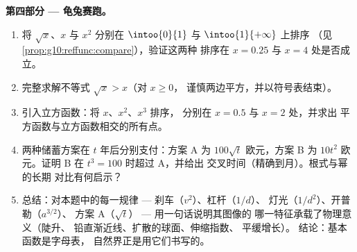 \begin{problem}
\medskip
\noindent\textbf{第四部分 --- 龟兔赛跑。}
\begin{enumerate}[resume]
  \item 将 $\sqrt x$、$x$ 与 $x^2$ 分别在 $\intoo{0}{1}$
        与 $\intoo{1}{+\infty}$ 上排序
        （见\cref{prop:g10:reffunc:compare}），验证这两种
        排序在 $x = 0.25$ 与 $x = 4$ 处是否成立。
  \item 完整求解不等式 $\sqrt x > x$（对 $x \geq 0$，
        谨慎两边平方，并以符号表结束）。
  \item 引入立方函数：将 $x$、$x^2$、$x^3$ 排序，
        分别在 $x = 0.5$ 与 $x = 2$ 处，并求出
        平方函数与立方函数相交的所有点。
  \item 两种储蓄方案在 $t$ 年后分别支付：方案 A 为 $100\sqrt t$
        欧元，方案 B 为 $10 t^2$ 欧元。证明 B 在 $t^3 = 100$
        时超过 A，并给出
        交叉时间（精确到月）。根式与幂的长期
        对比有何启示？
  \item 总结：对本题中的每一规律 --- 刹车（$v^2$）、杠杆（$1/d$）、
        灯光（$1/d^2$）、开普勒（$a^{3/2}$）、
        方案 A（$\sqrt t$） --- 用一句话说明其图像的
        哪一特征承载了物理意义（陡升、
        铅直渐近线、扩散的球面、伸缩指数、
        平缓增长）。
        结论：基本函数是字母表，
        自然界正是用它们书写的。
\end{enumerate}
\end{problem}
